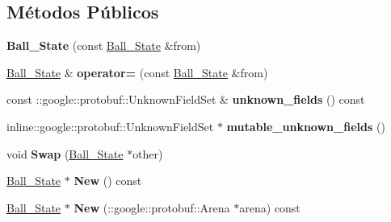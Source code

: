 \subsection*{Métodos Públicos}
\begin{DoxyCompactItemize}
\item 
{\bfseries Ball\+\_\+\+State} (const \hyperlink{classvss__state_1_1Ball__State}{Ball\+\_\+\+State} \&from)\hypertarget{classvss__state_1_1Ball__State_ac098b9cd5c2c3ddf8e51f0d2dbbf61fa}{}\label{classvss__state_1_1Ball__State_ac098b9cd5c2c3ddf8e51f0d2dbbf61fa}

\item 
\hyperlink{classvss__state_1_1Ball__State}{Ball\+\_\+\+State} \& {\bfseries operator=} (const \hyperlink{classvss__state_1_1Ball__State}{Ball\+\_\+\+State} \&from)\hypertarget{classvss__state_1_1Ball__State_aa6cd23990f9da364b87df28c633d5935}{}\label{classvss__state_1_1Ball__State_aa6cd23990f9da364b87df28c633d5935}

\item 
const \+::google\+::protobuf\+::\+Unknown\+Field\+Set \& {\bfseries unknown\+\_\+fields} () const \hypertarget{classvss__state_1_1Ball__State_a794e00572c1dadaee441bf94c11d7358}{}\label{classvss__state_1_1Ball__State_a794e00572c1dadaee441bf94c11d7358}

\item 
inline\+::google\+::protobuf\+::\+Unknown\+Field\+Set $\ast$ {\bfseries mutable\+\_\+unknown\+\_\+fields} ()\hypertarget{classvss__state_1_1Ball__State_a5d736fb563b0a4291d927a03394309b5}{}\label{classvss__state_1_1Ball__State_a5d736fb563b0a4291d927a03394309b5}

\item 
void {\bfseries Swap} (\hyperlink{classvss__state_1_1Ball__State}{Ball\+\_\+\+State} $\ast$other)\hypertarget{classvss__state_1_1Ball__State_a0e0face2c7b5e5b53793aa5e218a1623}{}\label{classvss__state_1_1Ball__State_a0e0face2c7b5e5b53793aa5e218a1623}

\item 
\hyperlink{classvss__state_1_1Ball__State}{Ball\+\_\+\+State} $\ast$ {\bfseries New} () const \hypertarget{classvss__state_1_1Ball__State_adc53dc3ec34e3721a215071717f7fde9}{}\label{classvss__state_1_1Ball__State_adc53dc3ec34e3721a215071717f7fde9}

\item 
\hyperlink{classvss__state_1_1Ball__State}{Ball\+\_\+\+State} $\ast$ {\bfseries New} (\+::google\+::protobuf\+::\+Arena $\ast$arena) const \hypertarget{classvss__state_1_1Ball__State_ac52ba5689a0c0f6361df46db91bdecf6}{}\label{classvss__state_1_1Ball__State_ac52ba5689a0c0f6361df46db91bdecf6}


\end{DoxyCompactItemize}
